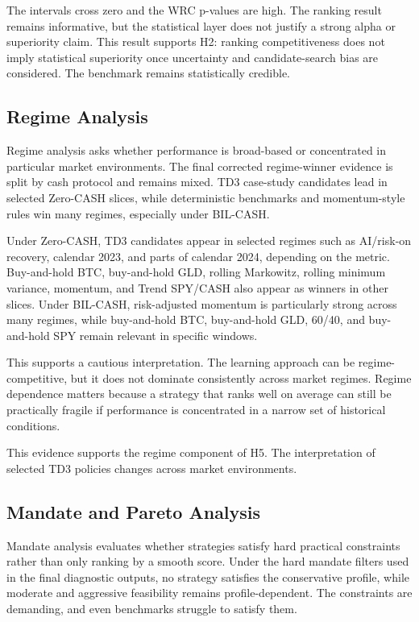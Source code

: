 \documentclass[12pt]{article}
\begin{document}
The intervals cross zero and the WRC p-values are high. The ranking result remains informative, but the statistical layer does not justify a strong alpha or superiority claim. This result supports H2: ranking competitiveness does not imply statistical superiority once uncertainty and candidate-search bias are considered. The benchmark remains statistically credible.

\subsection{Regime Analysis}

Regime analysis asks whether performance is broad-based or concentrated in particular market environments. The final corrected regime-winner evidence is split by cash protocol and remains mixed. TD3 case-study candidates lead in selected Zero-CASH slices, while deterministic benchmarks and momentum-style rules win many regimes, especially under BIL-CASH.

Under Zero-CASH, TD3 candidates appear in selected regimes such as AI/risk-on recovery, calendar 2023, and parts of calendar 2024, depending on the metric. Buy-and-hold BTC, buy-and-hold GLD, rolling Markowitz, rolling minimum variance, momentum, and Trend SPY/CASH also appear as winners in other slices. Under BIL-CASH, risk-adjusted momentum is particularly strong across many regimes, while buy-and-hold BTC, buy-and-hold GLD, 60/40, and buy-and-hold SPY remain relevant in specific windows.

This supports a cautious interpretation. The learning approach can be regime-competitive, but it does not dominate consistently across market regimes. Regime dependence matters because a strategy that ranks well on average can still be practically fragile if performance is concentrated in a narrow set of historical conditions.

This evidence supports the regime component of H5. The interpretation of selected TD3 policies changes across market environments.

\subsection{Mandate and Pareto Analysis}

Mandate analysis evaluates whether strategies satisfy hard practical constraints rather than only ranking by a smooth score. Under the hard mandate filters used in the final diagnostic outputs, no strategy satisfies the conservative profile, while moderate and aggressive feasibility remains profile-dependent. The constraints are demanding, and even benchmarks struggle to satisfy them.
\end{document}
